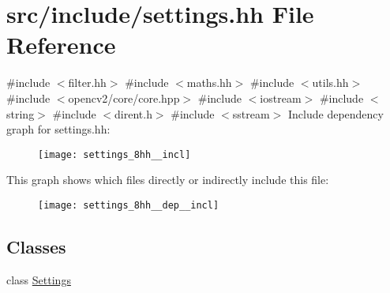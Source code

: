 \hypertarget{settings_8hh}{}\section{src/include/settings.hh File Reference}
\label{settings_8hh}
{\ttfamily \#include $<$filter.\+hh$>$}\newline
{\ttfamily \#include $<$maths.\+hh$>$}\newline
{\ttfamily \#include $<$utils.\+hh$>$}\newline
{\ttfamily \#include $<$opencv2/core/core.\+hpp$>$}\newline
{\ttfamily \#include $<$iostream$>$}\newline
{\ttfamily \#include $<$string$>$}\newline
{\ttfamily \#include $<$dirent.\+h$>$}\newline
{\ttfamily \#include $<$sstream$>$}\newline
Include dependency graph for settings.\+hh\+:
\nopagebreak
\begin{figure}[H]
\begin{center}
\leavevmode
\texttt{[image: settings\_8hh\_\_incl]}
\end{center}
\end{figure}
This graph shows which files directly or indirectly include this file\+:
\nopagebreak
\begin{figure}[H]
\begin{center}
\leavevmode
\texttt{[image: settings\_8hh\_\_dep\_\_incl]}
\end{center}
\end{figure}
\subsection*{Classes}
\begin{DoxyCompactItemize}
\item 
class \mbox{\hyperlink{class_settings}{Settings}}
\end{DoxyCompactItemize}
